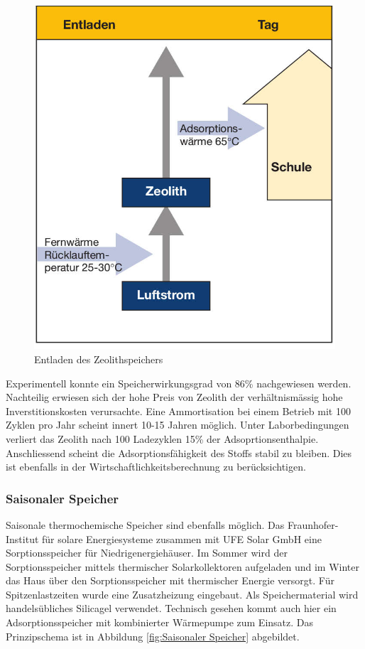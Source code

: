 \documentclass[11pt,a4paper]{scrartcl}
\begin{document}
\begin{figure}[h!]
\begin{center}
\includegraphics[scale=1]{images/Entladen.jpg}
\caption{Entladen des Zeolithspeichers \cite{BINE2}}
\label{fig:Entladen}
\end{center}
\end{figure}
Experimentell konnte ein Speicherwirkungsgrad von 86\% nachgewiesen werden.
Nachteilig erwiesen sich der hohe Preis von Zeolith der verhältnismässig hohe
Inverstitionskosten verursachte. Eine Ammortisation bei einem Betrieb mit 100
Zyklen pro Jahr scheint innert 10-15 Jahren möglich. Unter Laborbedingungen
verliert das Zeolith nach 100 Ladezyklen 15\% der Adsoprtionsenthalpie.
Anschliessend scheint die Adsorptionsfähigkeit des Stoffs stabil zu bleiben.
Dies ist ebenfalls in der Wirtschaftlichkeitsberechnung zu berücksichtigen.
\cite{BINE2}

\subsubsection{Saisonaler Speicher}
Saisonale thermochemische Speicher sind ebenfalls möglich. Das Fraunhofer-
Institut für solare Energiesysteme zusammen mit UFE Solar GmbH eine
Sorptionsspeicher für Niedrigenergiehäuser. Im Sommer wird der Sorptionsspeicher
mittels thermischer Solarkollektoren aufgeladen und im Winter das Haus über den
Sorptionsspeicher mit thermischer Energie versorgt. Für Spitzenlastzeiten wurde
eine Zusatzheizung eingebaut. Als Speichermaterial wird handelsübliches
Silicagel verwendet. Technisch gesehen kommt auch hier ein Adsorptionsspeicher
mit kombinierter Wärmepumpe zum Einsatz. Das Prinzipschema ist in Abbildung \ref{fig:Saisonaler Speicher}
abgebildet.
\end{document}
